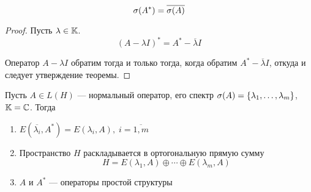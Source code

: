 \begin{lemma}
    \begin{equation*}
        \operatorname{\sigma}(A^*) = \overline{\operatorname{\sigma}(A)}
    \end{equation*}
\end{lemma}

\begin{proof}
    Пусть $\lambda \in \mathbb{K}$.
    \[ (A - \lambda I)^* = A^* - \overline{\lambda} I \]
    
    Оператор $A - \lambda I$ обратим тогда и только тогда, когда обратим $A^* -
    \overline{\lambda}I$, откуда и следует утверждение теоремы.
\end{proof}

\begin{theorem}\label{th:normaldiagonalizable}
    Пусть $A \in L(H)$ — нормальный оператор, его спектр $\operatorname{\sigma}(A) = \left\{\lambda_1,
    \dotsc, \lambda_m\right\}$, $\mathbb{K} = \mathbb{C}$. Тогда
    \begin{enumerate}
        \item $E(\overline{\lambda_i}, A^*) = E(\lambda_i, A), \; i =
            \overline{1,m}$
        \item Пространство $H$ раскладывается в ортогональную прямую сумму
            \[ H = E(\lambda_1, A) \oplus \dotsb \oplus E(\lambda_m, A) \]
        \item $A$ и $A^*$ — операторы простой структуры
    \end{enumerate}
\end{theorem}

